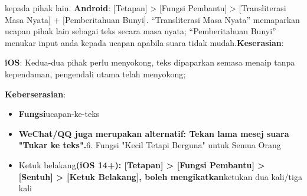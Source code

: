 \begin{tcbinfo}{kepada pihak lain.}
\textbf{Android}: [Tetapan] > [Fungsi Pembantu] > [Transliterasi Masa Nyata] + [Pemberitahuan Bunyi]. “Transliterasi Masa Nyata” memaparkan ucapan pihak lain sebagai teks secara masa nyata; “Pemberitahuan Bunyi” menukar input anda kepada ucapan apabila suara tidak mudah.\textbf{Keserasian}:

\textbf{iOS}: Kedua-dua pihak perlu menyokong, teks dipaparkan semasa menaip tanpa kependaman, pengendali utama telah menyokong;

\textbf{Keberserasian}:

\begin{itemize}
  \item \textbf{Fungsi}ucapan-ke-teks
  \item \textbf{WeChat/QQ juga merupakan alternatif: Tekan lama mesej suara "Tukar ke teks".}6. Fungsi "Kecil Tetapi Berguna" untuk Semua Orang
  \item Ketuk belakang\textbf{(iOS 14+): [Tetapan] > [Fungsi Pembantu] > [Sentuh] > [Ketuk Belakang], boleh mengikatkan}ketukan dua kali/tiga kali
\end{itemize}

\end{tcbinfo}


